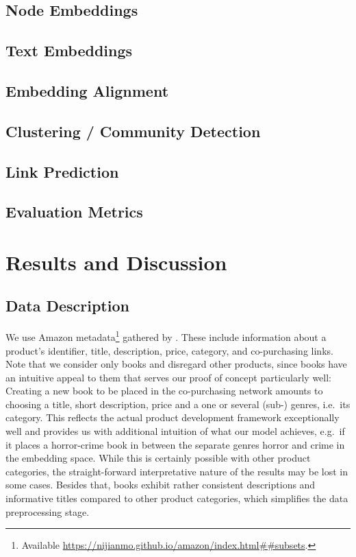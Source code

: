 \documentclass[a4paper]{article} %
\begin{document}
\subsection{Node Embeddings}

\subsection{Text Embeddings}

\subsection{Embedding Alignment}

\subsection{Clustering / Community Detection}

\subsection{Link Prediction}

\subsection{Evaluation Metrics}

\section{Results and Discussion}

\subsection{Data Description}

We use Amazon metadata\footnote{Available \url{https://nijianmo.github.io/amazon/index.html##subsets}.} gathered by \citet{ni2019}. These include information about a product's identifier, title, description, price, category, and co-purchasing links. Note that we consider only books and disregard other products, since books have an intuitive appeal to them that serves our proof of concept particularly well: Creating a new book to be placed in the co-purchasing network amounts to choosing a title, short description, price and a one or several (sub-) genres, i.e.\ its category. This reflects the actual product development framework exceptionally well and provides us with additional intuition of what our model achieves, e.g.\ if it places a horror-crime book in between the separate genres horror and crime in the embedding space. While this is certainly possible with other product categories, the straight-forward interpretative nature of the results may be lost in some cases. Besides that, books exhibit rather consistent descriptions and informative titles compared to other product categories, which simplifies the data preprocessing stage. 
\end{document}
